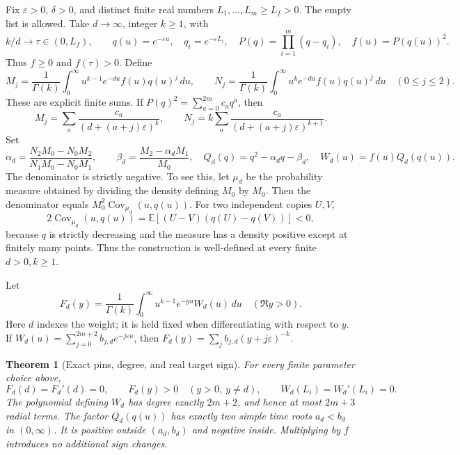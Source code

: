 \documentclass[11pt]{article}
\newtheorem{theorem}{Theorem}[section]
\theoremstyle{definition}
\theoremstyle{remark}
\begin{document}
Fix \(\varepsilon>0\), \(\delta>0\), and distinct finite real
numbers \(L_1,\ldots,L_m\ge L_f>0\).  The empty list is allowed.
Take \(d\to\infty\), integer \(k\ge1\), with
\begin{equation}
 k/d\to\tau\in(0,L_f),\qquad q(u)=e^{-\varepsilon u},\quad
 q_i=e^{-\varepsilon L_i},\quad
 P(q)=\prod_{i=1}^m(q-q_i),\quad f(u)=P(q(u))^2.
 \label{eq:f2v92-data}
\end{equation}
Thus \(f\ge0\) and \(f(\tau)>0\).  Define
\begin{equation}
 M_j=\frac1{\Gamma(k)}\int_0^\infty
       u^{k-1}e^{-du}f(u)q(u)^j\,du,\qquad
 N_j=\frac1{\Gamma(k)}\int_0^\infty
       u^ke^{-du}f(u)q(u)^j\,du\quad(0\le j\le2).
 \label{eq:f2v92-moments}
\end{equation}
These are explicit finite sums.  If
\(P(q)^2=\sum_{a=0}^{2m}c_aq^a\), then
\begin{equation}
 M_j=\sum_a\frac{c_a}{(d+(a+j)\varepsilon)^k},\qquad
 N_j=k\sum_a\frac{c_a}{(d+(a+j)\varepsilon)^{k+1}}.
 \label{eq:f2v92-finite-sums}
\end{equation}
Set
\begin{equation}
 \alpha_d=\frac{N_2M_0-N_0M_2}{N_1M_0-N_0M_1},\qquad
 \beta_d=\frac{M_2-\alpha_dM_1}{M_0},\quad
 Q_d(q)=q^2-\alpha_dq-\beta_d,
 \quad W_d(u)=f(u)Q_d(q(u)).
 \label{eq:f2v92-construction}
\end{equation}
The denominator is strictly negative.  To see this, let \(\mu_d\)
be the probability measure obtained by dividing the density defining
\(M_0\) by \(M_0\).  Then the denominator equals
\(M_0^2\operatorname{Cov}_{\mu_d}(u,q(u))\).  For two independent
copies \(U,V\),
\[
 2\operatorname{Cov}_{\mu_d}(u,q(u))
 =\mathbb E[(U-V)(q(U)-q(V))]<0,
\]
because \(q\) is strictly decreasing and the measure has a density
positive except at finitely many points.  Thus the construction is
well-defined at every finite \(d>0,k\ge1\).

Let
\begin{equation}
 F_d(y)=\frac1{\Gamma(k)}\int_0^\infty
             u^{k-1}e^{-yu}W_d(u)\,du\quad(\Re y>0).
 \label{eq:f2v92-response}
\end{equation}
Here \(d\) indexes the weight; it is held fixed when differentiating
with respect to \(y\).  If \(W_d(u)=\sum_{j=0}^{2m+2}b_{j,d}
e^{-j\varepsilon u}\), then
\(F_d(y)=\sum_jb_{j,d}(y+j\varepsilon)^{-k}\).

\begin{theorem}[Exact pins, degree, and real target sign]
\label{thm:f2v92-exact}
For every finite parameter choice above,
\begin{equation}
 F_d(d)=F_d'(d)=0,\qquad
 F_d(y)>0\quad(y>0,\ y\ne d),\qquad
 W_d(L_i)=W_d'(L_i)=0.
 \label{eq:f2v92-exact}
\end{equation}
The polynomial defining \(W_d\) has degree exactly \(2m+2\),
and hence at most \(2m+3\) radial terms.  The factor \(Q_d(q(u))\)
has exactly two simple time roots \(a_d<b_d\) in \((0,\infty)\).
It is positive outside \((a_d,b_d)\) and negative inside.  Multiplying
by \(f\) introduces no additional sign changes.
\end{theorem}
\end{document}
